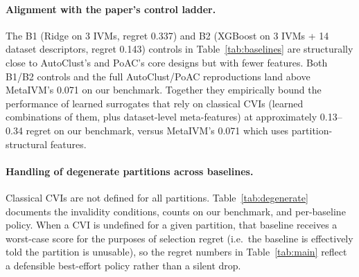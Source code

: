 \documentclass[10pt]{article} %
\begin{document}
\paragraph{Alignment with the paper's control ladder.} The B1 (Ridge on 3 IVMs, regret 0.337) and B2 (XGBoost on 3 IVMs + 14 dataset descriptors, regret 0.143) controls in Table~\ref{tab:baselines} are structurally close to AutoClust's and PoAC's core designs but with fewer features. Both B1/B2 controls and the full AutoClust/PoAC reproductions land above MetaIVM's 0.071 on our benchmark. Together they empirically bound the performance of learned surrogates that rely on classical CVIs (learned combinations of them, plus dataset-level meta-features) at approximately 0.13--0.34 regret on our benchmark, versus MetaIVM's 0.071 which uses partition-structural features.

\paragraph{Handling of degenerate partitions across baselines.} Classical CVIs are not defined for all partitions. Table~\ref{tab:degenerate} documents the invalidity conditions, counts on our benchmark, and per-baseline policy. When a CVI is undefined for a given partition, that baseline receives a worst-case score for the purposes of selection regret (i.e.\ the baseline is effectively told the partition is unusable), so the regret numbers in Table~\ref{tab:main} reflect a defensible best-effort policy rather than a silent drop.
\end{document}
